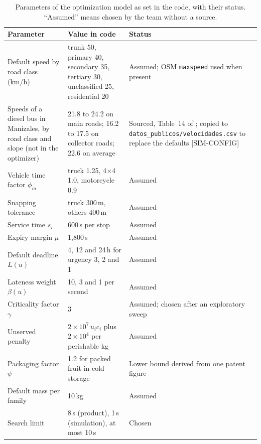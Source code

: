 \documentclass[11pt]{article}
\newcommand{\pend}[1]{\textcolor{red!60!black}{#1}}
\newcommand{\code}[1]{\texttt{\small #1}}
\begin{document}
\begin{table}[ht]
\centering
\small
\caption{Parameters of the optimization model as set in the code, with their status. ``Assumed'' means chosen by the team without a source.}
\label{tab:params}
\begin{tabularx}{\linewidth}{L{5.2cm} L{4.2cm} Y}
\toprule
Parameter & Value in code & Status \\
\midrule
Default speed by road class (km/h) & trunk 50, primary 40, secondary 35, tertiary 30, unclassified 25, residential 20 & Assumed; OSM \code{maxspeed} used when present \\
Speeds of a diesel bus in Manizales, by road class and slope (not in the optimizer) & 21.8 to 24.2 on main roads; 16.2 to 17.5 on collector roads; 22.6 on average & Sourced, Table~14 of \citet{ocampo2019costos}; copied to \code{datos\_publicos/}\allowbreak\code{velocidades.csv} to replace the defaults \pend{[SIM-CONFIG]} \\
Vehicle time factor $\phi_m$ & truck 1.25, 4$\times$4 1.0, motorcycle 0.9 & Assumed \\
Snapping tolerance & truck 300\,m, others 400\,m & Assumed \\
Service time $s_i$ & 600\,s per stop & Assumed \\
Expiry margin $\mu$ & 1,800\,s & Assumed \\
Default deadline $L(u)$ & 4, 12 and 24\,h for urgency 3, 2 and 1 & Assumed \\
Lateness weight $\beta(u)$ & 10, 3 and 1 per second & Assumed \\
Criticality factor $\gamma$ & 3 & Assumed; chosen after an exploratory sweep \\
Unserved penalty & $2\times10^{7}\,u_i c_i$ plus $2\times10^{4}$ per perishable kg & Assumed \\
Packaging factor $\psi$ & 1.2 for packed fruit in cold storage & Lower bound derived from one patent figure \\
Default mass per family & 10\,kg & Assumed \\
Search limit & 8\,s (product), 1\,s (simulation), at most 10\,s & Chosen \\
\bottomrule
\end{tabularx}
\end{table}
\end{document}
